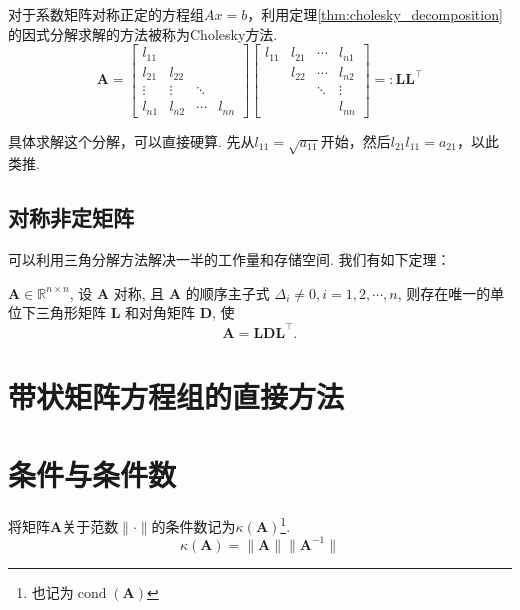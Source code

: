 对于系数矩阵对称正定的方程组$Ax=b$，利用定理\ref{thm:cholesky_decomposition}的因式分解求解的方法被称为Cholesky方法.
\[
    \boldsymbol{A}=\left[\begin{array}{cccc}
            l_{11}  &         &        &         \\
            l_{21}  & l_{22}  &        &         \\
            \vdots  & \vdots  & \ddots &         \\
            l_{n 1} & l_{n 2} & \cdots & l_{n n}
        \end{array}\right]\left[\begin{array}{cccc}
            l_{11} & l_{21} & \cdots & l_{n 1} \\
                   & l_{22} & \cdots & l_{n 2} \\
                   &        & \ddots & \vdots  \\
                   &        &        & l_{n n}
        \end{array}\right] =: \boldsymbol{L}\boldsymbol{L}^{\top}
\]
\begin{note}
    具体求解这个分解，可以直接硬算. 先从$l_{11}=\sqrt{a_{11}}$开始，然后$l_{21}l_{11}=a_{21}$，以此类推.
\end{note}

\subsection{对称非定矩阵}
可以利用三角分解方法解决一半的工作量和存储空间. 我们有如下定理：
\begin{theorem}
    $\boldsymbol{A} \in \mathbb{R}^{n \times n}$, 设 $\boldsymbol{A}$ 对称, 且 $\boldsymbol{A}$ 的顺序主子式 $\Delta_i \neq 0, i=1,2, \cdots, n$, 则存在唯一的单位下三角形矩阵 $\boldsymbol{L}$ 和对角矩阵 $\boldsymbol{D}$, 使
    \[
        \boldsymbol{A}=\boldsymbol{L} \boldsymbol{D} \boldsymbol{L}^{\top} .
    \]
\end{theorem}
\section{带状矩阵方程组的直接方法}


\section{条件与条件数}

\begin{definition}[矩阵的条件数]
    将矩阵$\boldsymbol{A}$关于范数$\lVert\cdot\rVert$的条件数记为$\kappa(\boldsymbol{A})$\footnote{也记为$\operatorname{cond}(\boldsymbol{A})$}.
    \[
        \kappa(\boldsymbol{A})=\lVert \boldsymbol{A}\rVert\lVert \boldsymbol{A}^{-1}\rVert
    \]
\end{definition}

